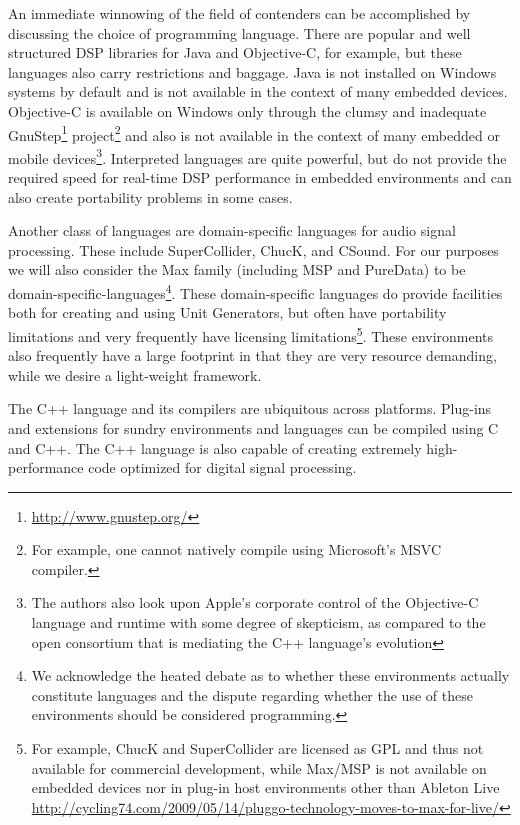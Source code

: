 \documentclass[twoside,10pt]{article}
\begin{document}
An immediate winnowing of the field of contenders can be accomplished by discussing the choice of programming language.  There are popular and well structured DSP libraries for Java\cite{Guillemard:2005, Burk:1998} and Objective-C\cite{Jaffe:1989,Jaffe:1991}, for example, but these languages also carry restrictions and baggage.  Java is not installed on Windows systems by default and is not available in the context of many embedded devices.  Objective-C is available on Windows only through the clumsy and inadequate GnuStep\footnote{\url{http://www.gnustep.org/}} project\footnote{For example, one cannot natively compile using Microsoft's MSVC compiler.} and also is not available in the context of many embedded or mobile devices\footnote{The authors also look upon Apple's corporate control of the Objective-C language and runtime with some degree of skepticism, as compared to the open consortium that is mediating the C++ language's evolution}.  Interpreted languages are quite powerful, but do not provide the required speed for real-time DSP performance in embedded environments and can also create portability problems in some cases.  

Another class of languages are domain-specific languages for audio signal processing.  These include SuperCollider\cite{McCartney:1996}, ChucK\cite{wang:2008}, and CSound.  For our purposes we will also consider the Max family (including MSP\cite{Zicarelli:1998} and PureData\cite{Puckette:1996}) to be domain-specific-languages\footnote{We acknowledge the heated debate as to whether these environments actually constitute languages and the dispute regarding whether the use of these environments should be considered programming.}.  These domain-specific languages do provide facilities both for creating and using Unit Generators, but often have portability limitations and very frequently have licensing limitations\footnote{For example, ChucK and SuperCollider are licensed as GPL and thus not available for commercial development, while Max/MSP is not available on embedded devices nor in plug-in host environments other than Ableton Live \url{http://cycling74.com/2009/05/14/pluggo-technology-moves-to-max-for-live/}}.  These environments also frequently have a large footprint in that they are very resource demanding, while we desire a light-weight framework.

The C++ language and its compilers are ubiquitous across platforms.  Plug-ins and extensions for sundry environments and languages can be compiled using C and C++.  The C++ language is also capable of creating extremely high-performance code optimized for digital signal processing.
\end{document}
